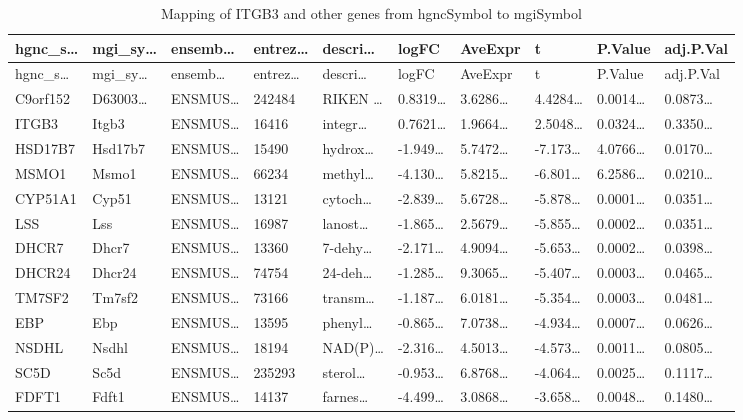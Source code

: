 \documentclass[
]{article}
\begin{document}
\begin{longtable}[]{@{}llllllllll@{}}
\caption{\label{tab:Mapping-of-ITGB3-and-other-genes-from-hgncSymbol-to-mgiSymbol}Mapping of ITGB3 and other genes from hgncSymbol to mgiSymbol}\tabularnewline
\toprule
hgnc\_s\ldots{} & mgi\_sy\ldots{} & ensemb\ldots{} & entrez\ldots{} & descri\ldots{} & logFC & AveExpr & t & P.Value & adj.P.Val\tabularnewline
\midrule
\endfirsthead
\toprule
hgnc\_s\ldots{} & mgi\_sy\ldots{} & ensemb\ldots{} & entrez\ldots{} & descri\ldots{} & logFC & AveExpr & t & P.Value & adj.P.Val\tabularnewline
\midrule
\endhead
C9orf152 & D63003\ldots{} & ENSMUS\ldots{} & 242484 & RIKEN \ldots{} & 0.8319\ldots{} & 3.6286\ldots{} & 4.4284\ldots{} & 0.0014\ldots{} & 0.0873\ldots{}\tabularnewline
ITGB3 & Itgb3 & ENSMUS\ldots{} & 16416 & integr\ldots{} & 0.7621\ldots{} & 1.9664\ldots{} & 2.5048\ldots{} & 0.0324\ldots{} & 0.3350\ldots{}\tabularnewline
HSD17B7 & Hsd17b7 & ENSMUS\ldots{} & 15490 & hydrox\ldots{} & -1.949\ldots{} & 5.7472\ldots{} & -7.173\ldots{} & 4.0766\ldots{} & 0.0170\ldots{}\tabularnewline
MSMO1 & Msmo1 & ENSMUS\ldots{} & 66234 & methyl\ldots{} & -4.130\ldots{} & 5.8215\ldots{} & -6.801\ldots{} & 6.2586\ldots{} & 0.0210\ldots{}\tabularnewline
CYP51A1 & Cyp51 & ENSMUS\ldots{} & 13121 & cytoch\ldots{} & -2.839\ldots{} & 5.6728\ldots{} & -5.878\ldots{} & 0.0001\ldots{} & 0.0351\ldots{}\tabularnewline
LSS & Lss & ENSMUS\ldots{} & 16987 & lanost\ldots{} & -1.865\ldots{} & 2.5679\ldots{} & -5.855\ldots{} & 0.0002\ldots{} & 0.0351\ldots{}\tabularnewline
DHCR7 & Dhcr7 & ENSMUS\ldots{} & 13360 & 7-dehy\ldots{} & -2.171\ldots{} & 4.9094\ldots{} & -5.653\ldots{} & 0.0002\ldots{} & 0.0398\ldots{}\tabularnewline
DHCR24 & Dhcr24 & ENSMUS\ldots{} & 74754 & 24-deh\ldots{} & -1.285\ldots{} & 9.3065\ldots{} & -5.407\ldots{} & 0.0003\ldots{} & 0.0465\ldots{}\tabularnewline
TM7SF2 & Tm7sf2 & ENSMUS\ldots{} & 73166 & transm\ldots{} & -1.187\ldots{} & 6.0181\ldots{} & -5.354\ldots{} & 0.0003\ldots{} & 0.0481\ldots{}\tabularnewline
EBP & Ebp & ENSMUS\ldots{} & 13595 & phenyl\ldots{} & -0.865\ldots{} & 7.0738\ldots{} & -4.934\ldots{} & 0.0007\ldots{} & 0.0626\ldots{}\tabularnewline
NSDHL & Nsdhl & ENSMUS\ldots{} & 18194 & NAD(P)\ldots{} & -2.316\ldots{} & 4.5013\ldots{} & -4.573\ldots{} & 0.0011\ldots{} & 0.0805\ldots{}\tabularnewline
SC5D & Sc5d & ENSMUS\ldots{} & 235293 & sterol\ldots{} & -0.953\ldots{} & 6.8768\ldots{} & -4.064\ldots{} & 0.0025\ldots{} & 0.1117\ldots{}\tabularnewline
FDFT1 & Fdft1 & ENSMUS\ldots{} & 14137 & farnes\ldots{} & -4.499\ldots{} & 3.0868\ldots{} & -3.658\ldots{} & 0.0048\ldots{} & 0.1480\ldots{}\tabularnewline
\bottomrule
\end{longtable}
\end{document}
